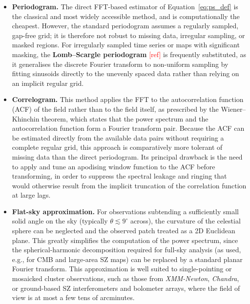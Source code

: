 \begin{itemize}
	\item \textbf{Periodogram.} The direct FFT-based estimator of Equation~\ref{eq:ps_def} is the classical and most widely accessible method, and is computationally the cheapest. However, the standard periodogram assumes a regularly sampled, gap-free grid; it is therefore not robust to missing data, irregular sampling, or masked regions. For irregularly sampled time series or maps with significant masking, the \textbf{Lomb--Scargle periodogram} \textcolor{red}{[ref]} is frequently substituted, as it generalises the discrete Fourier transform to non-uniform sampling by fitting sinusoids directly to the unevenly spaced data rather than relying on an implicit regular grid.
	
	\item \textbf{Correlogram.} This method applies the FFT to the autocorrelation function (ACF) of the field rather than to the field itself, as prescribed by the Wiener--Khinchin theorem, which states that the power spectrum and the autocorrelation function form a Fourier transform pair. Because the ACF can be estimated directly from the available data pairs without requiring a complete regular grid, this approach is comparatively more tolerant of missing data than the direct periodogram. Its principal drawback is the need to apply and tune an apodising window function to the ACF before transforming, in order to suppress the spectral leakage and ringing that would otherwise result from the implicit truncation of the correlation function at large lags.
	
	\item \textbf{Flat-sky approximation.} For observations subtending a sufficiently small solid angle on the sky (typically $\theta \lesssim 9^\circ$ across), the curvature of the celestial sphere can be neglected and the observed patch treated as a 2D Euclidean plane. This greatly simplifies the computation of the power spectrum, since the spherical-harmonic decomposition required for full-sky analysis (as used, e.g., for CMB and large-area SZ maps) can be replaced by a standard planar Fourier transform. This approximation is well suited to single-pointing or mosaicked cluster observations, such as those from \textit{XMM-Newton}, \textit{Chandra}, or ground-based SZ interferometers and bolometer arrays, where the field of view is at most a few tens of arcminutes.
	

\end{itemize}
